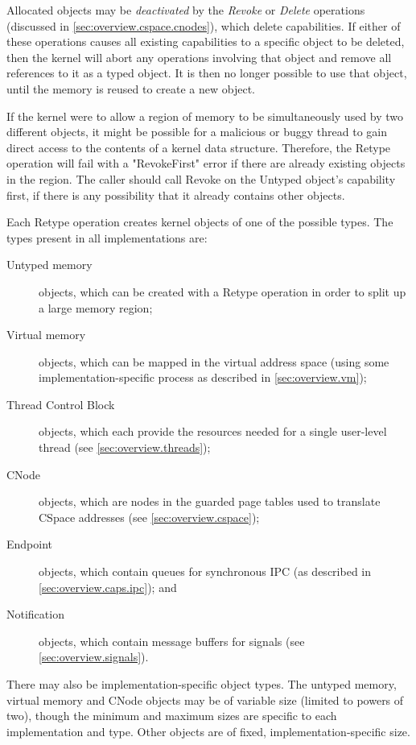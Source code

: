 Allocated objects may be \emph{deactivated} by the \emph{Revoke} or
\emph{Delete} operations (discussed in \autoref{sec:overview.cspace.cnodes}),
which delete capabilities. If either of these operations causes all existing
capabilities to a specific object to be deleted, then the kernel will abort any
operations involving that object and remove all references to it as a typed
object. It is then no longer possible to use that object, until the memory is
reused to create a new object.

If the kernel were to allow a region of memory to be simultaneously used by two
different objects, it might be possible for a malicious or buggy thread to gain
direct access to the contents of a kernel data structure. Therefore, the
Retype operation will fail with a "RevokeFirst" error if there are already
existing objects in the region. The caller should call Revoke on the Untyped
object's capability first, if there is any possibility that it already contains
other objects.

Each Retype operation creates kernel objects of one of the possible types. The
types present in all implementations are:

\begin{description}
\item [Untyped memory] objects, which can be created with a Retype operation
in order to split up a large memory region;
\item [Virtual memory] objects, which can be mapped in the virtual address
space (using some implementation-specific process as described in
\autoref{sec:overview.vm});
\item [Thread Control Block] objects, which each provide the resources needed
for a single user-level thread (see \autoref{sec:overview.threads});
\item [CNode] objects, which are nodes in the guarded page tables used to
translate CSpace addresses (see \autoref{sec:overview.cspace});
\item [Endpoint] objects, which contain queues for synchronous IPC (as
described in \autoref{sec:overview.caps.ipc}); and
\item [Notification] objects, which contain message buffers for
signals (see \autoref{sec:overview.signals}).
\end{description}

There may also be implementation-specific object types. The untyped
memory, virtual memory and CNode objects may be of variable size (limited to
powers of two), though the minimum and maximum sizes are specific to each
implementation and type. Other objects are of fixed, implementation-specific
size.

